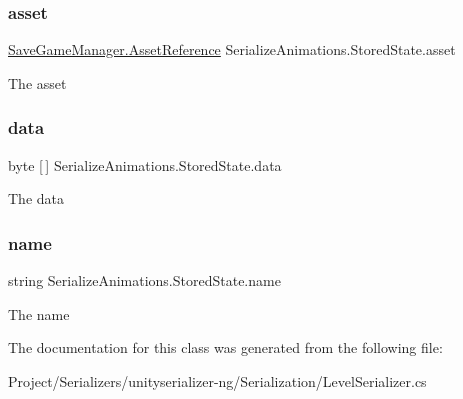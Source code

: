 \subsubsection{\texorpdfstring{asset}{asset}}
{\footnotesize\ttfamily \hyperlink{class_save_game_manager_1_1_asset_reference}{Save\+Game\+Manager.\+Asset\+Reference} Serialize\+Animations.\+Stored\+State.\+asset}



The asset 

\mbox{\label{class_serialize_animations_1_1_stored_state_a7689e54eaf7039191650d5008df1b8e2}} 
\subsubsection{\texorpdfstring{data}{data}}
{\footnotesize\ttfamily byte \mbox{[}$\,$\mbox{]} Serialize\+Animations.\+Stored\+State.\+data}



The data 

\mbox{\label{class_serialize_animations_1_1_stored_state_a2672a0862ad5485351ea58c5e61cbe58}} 
\subsubsection{\texorpdfstring{name}{name}}
{\footnotesize\ttfamily string Serialize\+Animations.\+Stored\+State.\+name}



The name 



The documentation for this class was generated from the following file\+:\begin{DoxyCompactItemize}
\item 
Project/\+Serializers/unityserializer-\/ng/\+Serialization/Level\+Serializer.\+cs\end{DoxyCompactItemize}
